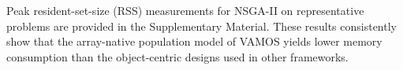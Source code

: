 \documentclass[final,5p,times,twocolumn]{elsarticle}
\newcommand{\VAMOS}{VAMOS}
\begin{document}



%
%


Peak resident-set-size (RSS) measurements for NSGA-II on representative problems are provided in the Supplementary Material. These results consistently show that the array-native population model of \VAMOS{} yields lower memory consumption than the object-centric designs used in other frameworks.
\end{document}
